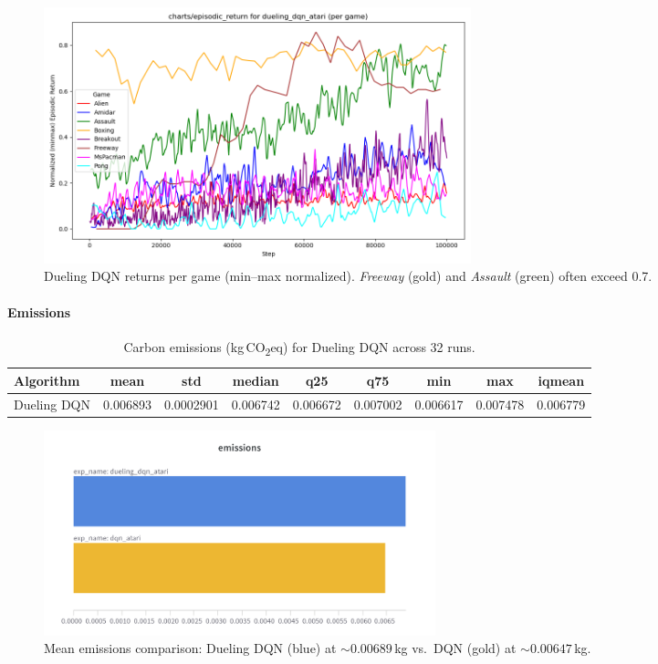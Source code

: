\begin{figure}
	\centering
	\includegraphics[width=0.6\textwidth]{figures/dueling_dqn/charts_episodic_return_per_game_minmax_dueling_dqn_atari.png}
	\caption{Dueling DQN returns per game (min--max normalized). 
		\emph{Freeway} (gold) and \emph{Assault} (green) often exceed 0.7.}
	\label{fig:dueling_return_pergame_minmax}
\end{figure}

\paragraph{Emissions}

\begin{table}
	\caption{Carbon emissions (kg\,CO\textsubscript{2}eq) for Dueling DQN across 32 runs.}
	\label{tab:dueling_dqn_emissions}
	\centering
	\begin{tabular}{lcccccccc}
		\toprule
		\textbf{Algorithm} & \textbf{mean} & \textbf{std} & \textbf{median} & 
		\textbf{q25} & \textbf{q75} & \textbf{min} & \textbf{max} & \textbf{iqmean} \\
		\midrule
		Dueling DQN & 0.006893 & 0.0002901 & 0.006742 & 0.006672 & 0.007002 & 0.006617 & 0.007478 & 0.006779 \\
		\bottomrule
	\end{tabular}
\end{table}

\begin{figure}
	\centering
	\includegraphics[width=0.55\textwidth]{figures/dueling_dqn/emissions_dqn_dueling.png}
	\caption{Mean emissions comparison: Dueling DQN (blue) at $\sim0.00689$\,kg vs.\ DQN (gold) at $\sim0.00647$\,kg.}
	\label{fig:dueling_emissions_barplot}
\end{figure}

